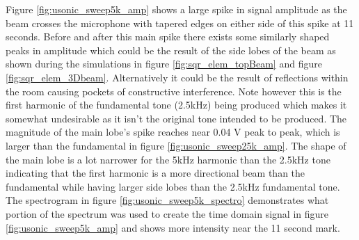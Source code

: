 Figure \ref{fig:usonic_sweep5k_amp} shows a large spike in signal amplitude as the beam crosses the microphone with tapered edges on either side of this spike at 11 seconds. Before and after this main spike there exists some similarly shaped peaks in amplitude which could be the result of the side lobes of the beam as shown during the simulations in figure \ref{fig:sqr_elem_topBeam} and figure \ref{fig:sqr_elem_3Dbeam}. Alternatively it could be the result of reflections within the room causing pockets of constructive interference. Note however this is the first harmonic of the fundamental tone (2.5kHz) being produced which makes it somewhat undesirable as it isn't the original tone intended to be produced.
The magnitude of the main lobe's spike reaches near 0.04 V peak to peak, which is larger than the fundamental in figure \ref{fig:usonic_sweep25k_amp}. The shape of the main lobe is a lot narrower for the 5kHz harmonic than the 2.5kHz tone indicating that the first harmonic is a more directional beam than the fundamental while having larger side lobes than the 2.5kHz fundamental tone.
The spectrogram in figure \ref{fig:usonic_sweep5k_spectro} demonstrates what portion of the spectrum was used to create the time domain signal in figure \ref{fig:usonic_sweep5k_amp} and shows more intensity near the 11 second mark.

